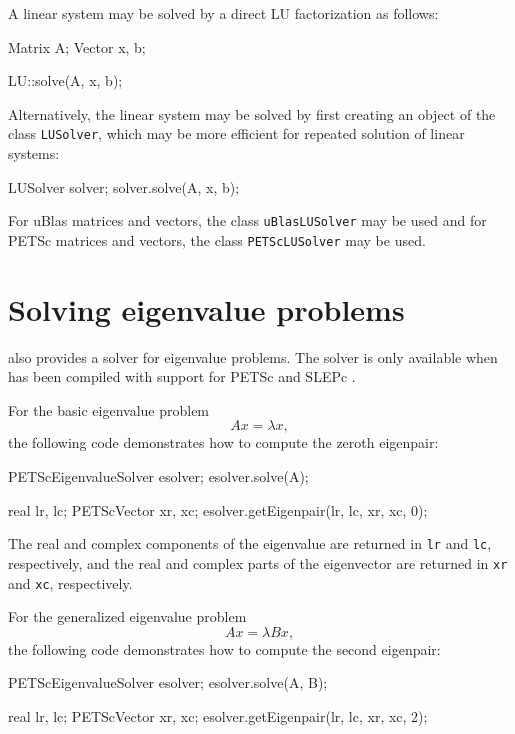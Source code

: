 A linear system may be solved by a direct LU factorization as follows:
\begin{code}
Matrix A;
Vector x, b;
  
LU::solve(A, x, b);
\end{code}
Alternatively, the linear system may be solved by first creating an
object of the class \texttt{LUSolver}, which may be more efficient for
repeated solution of linear systems:
\begin{code}
LUSolver solver;
solver.solve(A, x, b);
\end{code}

For uBlas matrices and vectors, the class \texttt{uBlasLUSolver} may
be used and for PETSc matrices and vectors, the class
\texttt{PETScLUSolver} may be used.

\section{Solving eigenvalue problems}

\dolfin{} also provides a solver for eigenvalue
problems. The solver is only available when
\dolfin{} has been compiled with support for PETSc and SLEPc \cite{www:slepc}.

For the basic eigenvalue problem
\begin{equation}
  Ax = \lambda x,
\end{equation}
the following code demonstrates how to compute the zeroth eigenpair:
\begin{code} 
PETScEigenvalueSolver esolver; 
esolver.solve(A);

real lr, lc;
PETScVector xr, xc;
esolver.getEigenpair(lr, lc, xr, xc, 0);
\end{code} 
The real and complex components of the eigenvalue are returned in \texttt{lr}
and \texttt{lc}, respectively, and the real and complex parts of the eigenvector
are returned in \texttt{xr} and \texttt{xc}, respectively.

For the generalized eigenvalue problem
\begin{equation}
 A x = \lambda B x,
\end{equation}
the following code demonstrates how to compute the second eigenpair:
\begin{code} 
PETScEigenvalueSolver esolver; 
esolver.solve(A, B);

real lr, lc;
PETScVector xr, xc;
esolver.getEigenpair(lr, lc, xr, xc, 2);
\end{code} 

